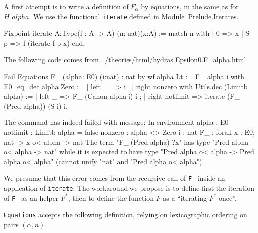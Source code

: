 A first attempt is to write a definition of $F_\alpha$ by equations, in the same as for $H\_alpha$.  We use the functional \texttt{iterate} defined in 
Module~\href{../theories/html/hydras.Prelude.Iterates.html\#iterate}{Prelude.Iterates}.

\begin{Coqsrc}
Fixpoint iterate {A:Type}(f : A -> A) (n: nat)(x:A) :=
  match n with
  | 0 => x
  | S p => f (iterate  f p x)
  end.
\end{Coqsrc}

The following code comes from 
 \url{../theories/html/hydras.Epsilon0.F_alpha.html}.


\begin{Coqsrc}
Fail Equations F_ (alpha: E0) (i:nat) :  nat  by wf  alpha Lt :=
  F_ alpha  i with E0_eq_dec alpha Zero :=
    { | left _ =>  i ;
      | right nonzero
          with Utils.dec (Limitb alpha) :=
          { | left _ =>  F_ (Canon alpha i)  i ;
            | right notlimit =>  iterate (F_ (Pred alpha))  (S i) i}}.
\end{Coqsrc}

\begin{Coqanswer}
The command has indeed failed with message:
In environment
alpha : E0
notlimit : Limitb alpha = false
nonzero : alpha <> Zero
i : nat
F_ : forall x : E0, nat -> x o< alpha -> nat
The term "F_ (Pred alpha) ?x" has type "Pred alpha o< alpha -> nat"
while it is expected to have type "Pred alpha o< alpha -> Pred alpha o< alpha"
(cannot unify "nat" and "Pred alpha o< alpha").
\end{Coqanswer}


We presume that this error comes from the recursive call of \texttt{F\_} inside
an application of \texttt{iterate}. The workaround we propose is to define first 
the iteration of \texttt{F\_}  as an helper $F^*$, then to define the function $F$ as a ``iterating $F^*$ once''.

\texttt{Equations} accepts the following definition, relying on  lexicographic ordering on pairs $(\alpha,n)$.


\label{sect:F-equations}

\label{Functions:F-alpha}
  
